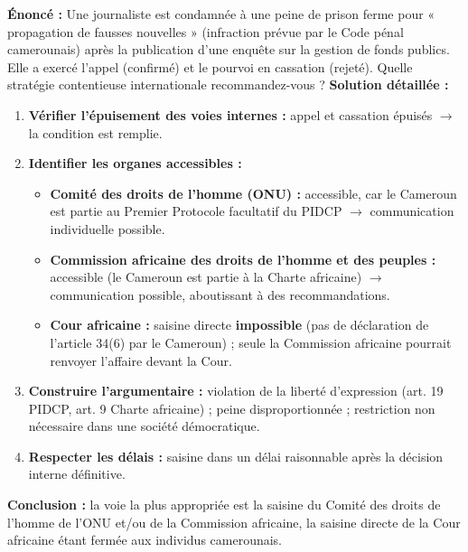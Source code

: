 \documentclass[11pt]{article}
\begin{document}
\begin{exoresolu}
\textbf{Énoncé :} Une journaliste est condamnée à une peine de prison ferme pour « propagation de fausses nouvelles » (infraction prévue par le Code pénal camerounais) après la publication d'une enquête sur la gestion de fonds publics. Elle a exercé l'appel (confirmé) et le pourvoi en cassation (rejeté). Quelle stratégie contentieuse internationale recommandez-vous ?
\tcblower
\textbf{Solution détaillée :}
\begin{enumerate}
    \item \textbf{Vérifier l'épuisement des voies internes :} appel et cassation épuisés $\rightarrow$ la condition est remplie.
    \item \textbf{Identifier les organes accessibles :}
    \begin{itemize}
        \item \textbf{Comité des droits de l'homme (ONU) :} accessible, car le Cameroun est partie au Premier Protocole facultatif du PIDCP $\rightarrow$ communication individuelle possible.
        \item \textbf{Commission africaine des droits de l'homme et des peuples :} accessible (le Cameroun est partie à la Charte africaine) $\rightarrow$ communication possible, aboutissant à des recommandations.
        \item \textbf{Cour africaine :} saisine directe \textbf{impossible} (pas de déclaration de l'article 34(6) par le Cameroun) ; seule la Commission africaine pourrait renvoyer l'affaire devant la Cour.
    \end{itemize}
    \item \textbf{Construire l'argumentaire :} violation de la liberté d'expression (art. 19 PIDCP, art. 9 Charte africaine) ; peine disproportionnée ; restriction non nécessaire dans une société démocratique.
    \item \textbf{Respecter les délais :} saisine dans un délai raisonnable après la décision interne définitive.
\end{enumerate}
\textbf{Conclusion :} la voie la plus appropriée est la saisine du Comité des droits de l'homme de l'ONU et/ou de la Commission africaine, la saisine directe de la Cour africaine étant fermée aux individus camerounais.
\end{exoresolu}
\end{document}
